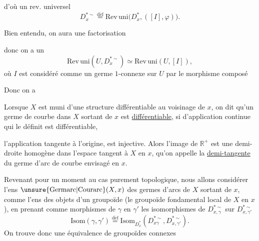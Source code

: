 
d'où un rev. universel
\[
\tag{70}
D_x^{*\sim}\overset{\mathrm{d\acute ef}}{=}
\mathrm{Rev\,uni}\bigl(D_x^*,([I],\varphi)\bigr).
\]

Bien entendu, on aura une factorisation

donc on a un 
\[
\tag{71}
\mathrm{Rev\,uni}(U,D_x^{*\sim})\simeq
\mathrm{Rev\,uni}(U,[I]),
\]
où $I$ est considéré comme un germe $1$-connexe sur $U$ par le morphisme composé

Donc on a

Lorsque $X$ est muni d'une structure différentiable au voisinage de $x$, on dit qu'un germe de courbe dans $X$ sortant de $x$ est \uline{différentiable}, si   d'application continue
qui le définit est différentiable, 


l'application tangente à l'origine, 
est injective. Alors l'image de $\mathbb R^+$ est une demi-droite homogène dans l'espace tangent à $X$ en $x$, qu'on appelle la \uline{demi-tangente} du germe d'arc de courbe envisagé en $x$.

Revenant pour un moment au cas purement topologique, nous allons considérer l'ens $\unsure{\mathrm{Germarc}|\mathrm{Courarc}}(X,x)$ des germes d'arcs de $X$ sortant de $x$, comme l'ens des objets d'un groupoïde (le groupoïde fondamental local de $X$ en $x$), en prenant comme morphismes de $\gamma$ en $\gamma'$  les isomorphismes de  $D_{x,\gamma}^{*\sim}$ sur $D_{x,\gamma'}^{*\sim}$
\[
\tag{74}
\mathrm{Isom}(\gamma,\gamma')\overset{\mathrm{d\acute ef}}{=}
\mathrm{Isom}_{D_x^*}(D_{x\gamma}^{*\sim},D_{x,\gamma'}^{*\sim}).
\]
On trouve donc  une équivalence de  groupoïdes connexes

